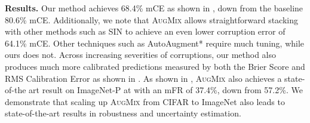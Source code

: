 \documentclass{article} \usepackage{iclr2020_conference,times}
\begin{document}
\noindent\textbf{Results.}
Our method achieves 68.4\% mCE as shown in , down from the baseline 80.6\% mCE. Additionally, we note that \textsc{AugMix} allows straightforward stacking with other methods such as SIN to achieve an even lower corruption error of 64.1\% mCE. Other techniques such as AutoAugment* require much tuning, while ours does not. Across increasing severities of corruptions, our method also produces much more calibrated predictions measured by both the Brier Score and RMS Calibration Error as shown in . As shown in , \textsc{AugMix} also achieves a state-of-the art result on ImageNet-P at with an mFR of 37.4\%, down from 57.2\%.
We demonstrate that scaling up \textsc{AugMix} from CIFAR to ImageNet also leads to state-of-the-art results in robustness and uncertainty estimation.
\end{document}
